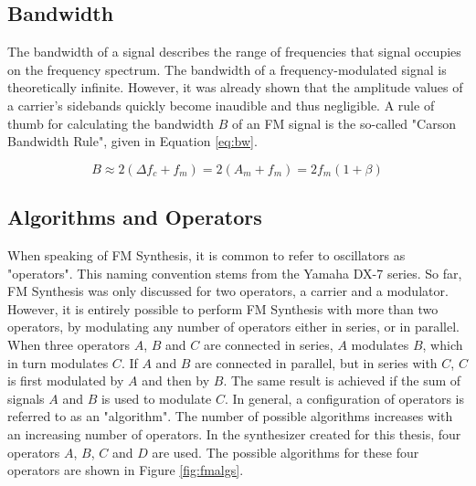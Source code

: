 \documentclass[12pt,twoside]{report}
\begin{document}
\subsection{Bandwidth}

The bandwidth of a signal describes the range of frequencies that signal occupies on the frequency spectrum. The bandwidth of a frequency-modulated signal is theoretically infinite. However, it was already shown that the amplitude values of a carrier's sidebands quickly become inaudible and thus negligible. A rule of thumb for calculating the bandwidth $B$ of an FM signal is the so-called "Carson Bandwidth Rule", given in Equation \ref{eq:bw}.

\begin{equation}
  B \approx 2(\Delta f_{c} + f_{m}) = 2(A_{m} + f_{m}) = 2f_{m}(1 + \beta)
  \label{eq:bw}
\end{equation}

\subsection{Algorithms and Operators}

When speaking of FM Synthesis, it is common to refer to oscillators as "operators". This naming convention stems from the Yamaha DX-7 series. So far, FM Synthesis was only discussed for two operators, a carrier and a modulator. However, it is entirely possible to perform FM Synthesis with more than two operators, by modulating any number of operators either in series, or in parallel. When three operators $A$, $B$ and $C$ are connected in series, $A$ modulates $B$, which in turn modulates $C$. If $A$ and $B$ are connected in parallel, but in series with $C$, $C$ is first modulated by $A$ and then by $B$. The same result is achieved if the sum of signals $A$ and $B$ is used to modulate $C$. In general, a configuration of operators is referred to as an "algorithm". The number of possible algorithms increases with an increasing number of operators. In the synthesizer created for this thesis, four operators $A$, $B$, $C$ and $D$ are used. The possible algorithms for these four operators are shown in Figure \ref{fig:fmalgs}.
\end{document}
